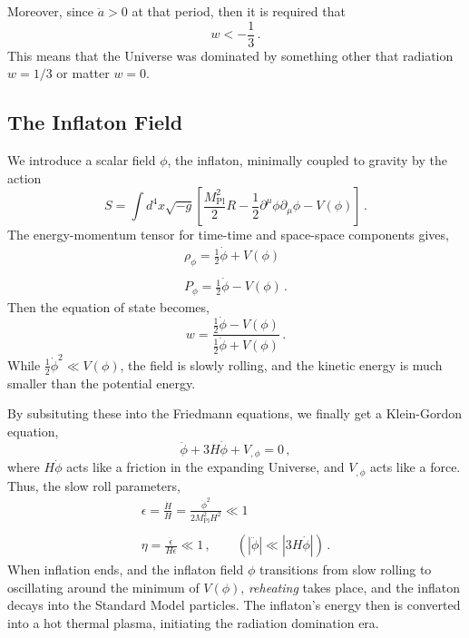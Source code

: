 \documentclass{book}
\begin{document}
	Moreover, since $\ddot a >0$ at that period, then it is required that 
	\begin{equation*}
		w<-\frac13 \,.
	\end{equation*}
	This means that the Universe was dominated by something other that radiation $w=1/3$ or matter $w=0$.
	
	\subsection*{The Inflaton Field}
	We introduce a scalar field $\phi$, the inflaton, minimally coupled to gravity by the action
	\begin{equation}
		\label{inflaton_action}
		S=\int d^4x \sqrt{-g}\left[ \frac{M^2_\text{Pl}}{2} R - \frac12 \partial^\mu \phi \partial_\mu \phi - V(\phi) \right] \, .
	\end{equation}
	The energy-momentum tensor for time-time and space-space components gives,
	\begin{equation}
		\begin{array}{c}
			\rho_\phi = \frac12 \dot \phi + V(\phi) \\ \, \\ 
			P_\phi = \frac12 \dot \phi - V(\phi) \, . 
		\end{array}
	\end{equation}
	Then the equation of state becomes,
	\begin{equation}
		w=\frac{\frac12 \dot \phi - V(\phi)}{\frac12 \dot \phi + V(\phi)} \, .
	\end{equation}
	While $\frac12 \dot \phi^2 \ll V(\phi)$, the field is slowly rolling, and the kinetic energy is much smaller than the potential energy.
	
	By subsituting these into the Friedmann equations, we finally get a Klein-Gordon equation,
	\begin{equation}
		\label{klein_gordon_inflaton}
		\ddot{\phi} + 3H \dot \phi + V_{,\phi}=0 \, ,
	\end{equation}
	where $H\dot\phi$ acts like a friction in the expanding Universe, and $V_{,\phi}$ acts like a force. Thus, the slow roll parameters, 
	\begin{equation}
		\label{slow_roll_parameters}
		\begin{array}{c}
			\epsilon=\frac{\dot H}{H}=\frac{\dot \phi^2}{2M^2_\text{Pl}H^2}\ll 1 \\ \, \\
			\eta = \frac{\dot \epsilon}{H \epsilon} \ll 1 \, , \qquad (|\ddot \phi|\ll |3H\dot \phi|)\, . 
		\end{array}
	\end{equation}
	When inflation ends, and the inflaton field $\phi$ transitions from slow rolling to oscillating around the minimum of $V(\phi)$, \textit{reheating} takes place, and the inflaton decays into the Standard Model particles. The inflaton's energy then is converted into a hot thermal plasma, initiating the radiation domination era.
\end{document}
